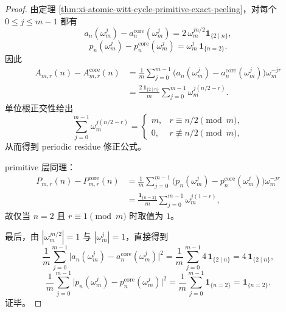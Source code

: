 \begin{proof}
由定理 \ref{thm:xi-atomic-witt-cycle-primitive-exact-peeling}，对每个 \(0\le j\le m-1\) 都有
\[
a_n(\omega_m^j)-a_n^{\mathrm{core}}(\omega_m^j)
=
2\,\omega_m^{j n/2}\mathbf 1_{\{2\mid n\}},
\]
\[
p_n(\omega_m^j)-p_n^{\mathrm{core}}(\omega_m^j)
=
\omega_m^j\,\mathbf 1_{\{n=2\}}.
\]
因此
\[
\begin{aligned}
A_{m,r}(n)-A_{m,r}^{\mathrm{core}}(n)
&=
\frac1m\sum_{j=0}^{m-1}
\bigl(a_n(\omega_m^j)-a_n^{\mathrm{core}}(\omega_m^j)\bigr)\omega_m^{-jr} \\
&=
\frac{2\,\mathbf 1_{\{2\mid n\}}}{m}
\sum_{j=0}^{m-1}\omega_m^{j(n/2-r)}.
\end{aligned}
\]
单位根正交性给出
\[
\sum_{j=0}^{m-1}\omega_m^{j(n/2-r)}
=
\begin{cases}
m,& r\equiv n/2\pmod m,\\
0,& r\not\equiv n/2\pmod m,
\end{cases}
\]
从而得到 periodic residue 修正公式。

primitive 层同理：
\[
\begin{aligned}
P_{m,r}(n)-P_{m,r}^{\mathrm{core}}(n)
&=
\frac1m\sum_{j=0}^{m-1}
\bigl(p_n(\omega_m^j)-p_n^{\mathrm{core}}(\omega_m^j)\bigr)\omega_m^{-jr} \\
&=
\frac{\mathbf 1_{\{n=2\}}}{m}
\sum_{j=0}^{m-1}\omega_m^{j(1-r)},
\end{aligned}
\]
故仅当 \(n=2\) 且 \(r\equiv 1\pmod m\) 时取值为 \(1\)。

最后，由 \(|\omega_m^{j n/2}|=1\) 与 \(|\omega_m^j|=1\)，直接得到
\[
\frac1m\sum_{j=0}^{m-1}
\bigl|a_n(\omega_m^j)-a_n^{\mathrm{core}}(\omega_m^j)\bigr|^2
=
\frac1m\sum_{j=0}^{m-1}4\,\mathbf 1_{\{2\mid n\}}
=
4\,\mathbf 1_{\{2\mid n\}},
\]
\[
\frac1m\sum_{j=0}^{m-1}
\bigl|p_n(\omega_m^j)-p_n^{\mathrm{core}}(\omega_m^j)\bigr|^2
=
\frac1m\sum_{j=0}^{m-1}\mathbf 1_{\{n=2\}}
=
\mathbf 1_{\{n=2\}}.
\]
证毕。
\end{proof}

